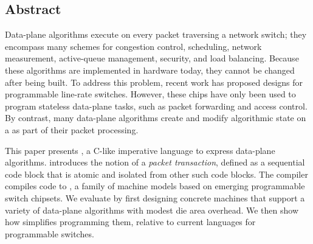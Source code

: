 \subsection*{Abstract}
Data-plane algorithms execute on every packet traversing a network switch; they
encompass many schemes for congestion control, scheduling, network measurement,
active-queue management, security, and load balancing. Because these algorithms
are implemented in hardware today, they cannot be changed after being built. To
address this problem, recent work has proposed designs for programmable
line-rate switches.  However, these chips have only been used to program
stateless data-plane tasks, such as packet forwarding and access control. By
contrast, many data-plane algorithms create and modify algorithmic state on a
as part of their packet processing.

This paper presents \pktlanguage, a C-like imperative language to express
data-plane algorithms. \pktlanguage introduces the notion of a {\em packet
transaction}, defined as a sequential code block that is atomic and isolated
from other such code blocks.  The \pktlanguage compiler compiles \pktlanguage
code to \absmachine, a family of machine models based on emerging
programmable switch chipsets. We evaluate \pktlanguage by first designing
concrete \absmachine machines that support a variety of data-plane algorithms
with modest die area overhead. We then show how \pktlanguage simplifies
programming them, relative to current languages for programmable switches.
